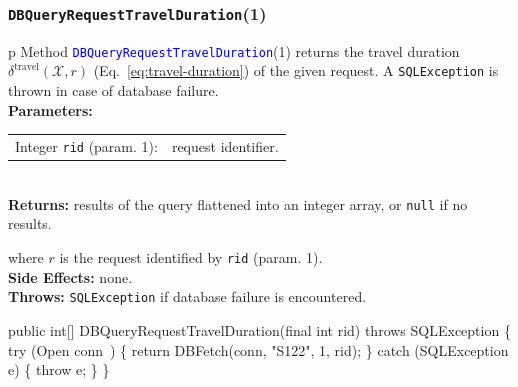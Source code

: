 \documentclass{article}
\def\nwendcode{\endtrivlist \endgroup}      %
\let\nwdocspar=\par
\theoremstyle{definition}                   %
\begin{document}
\subsubsection{{\tt{}\protect{}DBQueryRequestTravelDuration}(1)}
\begin{tabular}{p{\textwidth}}
\toprule
{}
Method \textcolor{blue}{{\tt{}\protect{}DBQueryRequestTravelDuration}}(1) returns the
travel duration $\delta^\textrm{travel}(\mathcal{X},r)$
(Eq.~\ref{eq:travel-duration}) of the given request.
A {\tt{}SQLException} is thrown in case of database failure.\\
\midrule
\textbf{Parameters:}\\
\begin{tabular}{lp{116mm}}
Integer {\tt{}rid} (param. 1):&request identifier.
\end{tabular}\\
\textbf{Returns:} results of the query flattened into an integer array,
or {\tt{}null} if no results.


where $r$ is the request identified by {\tt{}rid} (param. 1).\\
\textbf{Side Effects:} none.\\
\textbf{Throws:} {\tt{}SQLException} if database failure is encountered.\\
\bottomrule
\end{tabular}
\nwenddocs{}\plusendmoddef
public int[] DBQueryRequestTravelDuration(final int rid) throws SQLException \{
  try (\LA{}Open \code{}conn\edoc{}~{\nwtagstyle{}}\RA{}) \{
    return DBFetch(conn, "S122", 1, rid);
  \} catch (SQLException e) \{
    throw e;
  \}
\}
\eatline
{}\nwendcode{}\nwdocspar
\end{document}
